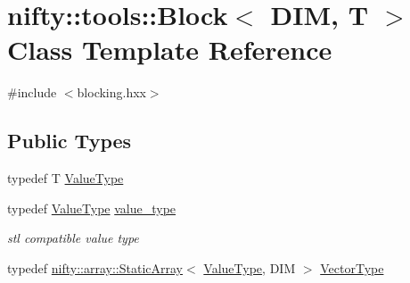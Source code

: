 \hypertarget{classnifty_1_1tools_1_1Block}{}\section{nifty\+:\+:tools\+:\+:Block$<$ D\+I\+M, T $>$ Class Template Reference}
\label{classnifty_1_1tools_1_1Block}


{\ttfamily \#include $<$blocking.\+hxx$>$}

\subsection*{Public Types}
\begin{DoxyCompactItemize}
\item 
typedef T \hyperlink{classnifty_1_1tools_1_1Block_a3e77342701a32fcc670d398f1b9bc6d4}{Value\+Type}
\item 
typedef \hyperlink{classnifty_1_1tools_1_1Block_a3e77342701a32fcc670d398f1b9bc6d4}{Value\+Type} \hyperlink{classnifty_1_1tools_1_1Block_accbed9defe9a82425025d9182c41e0a6}{value\+\_\+type}
\begin{DoxyCompactList}\small\item\em stl compatible value type \end{DoxyCompactList}\item 
typedef \hyperlink{namespacenifty_1_1array_a683f151f19c851754e0c6d55ed16a0c2}{nifty\+::array\+::\+Static\+Array}$<$ \hyperlink{classnifty_1_1tools_1_1Block_a3e77342701a32fcc670d398f1b9bc6d4}{Value\+Type}, D\+I\+M $>$ \hyperlink{classnifty_1_1tools_1_1Block_aa077b4ebbf3e4e9b679d1957ca10ba32}{Vector\+Type}
\end{DoxyCompactItemize}
